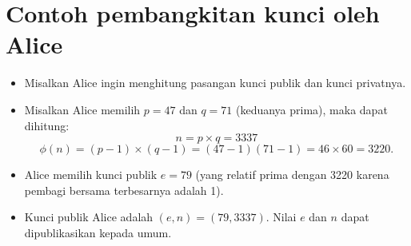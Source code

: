 \documentclass{article}
\begin{document}

\section*{Contoh pembangkitan kunci oleh Alice}

\begin{itemize}
    \item Misalkan Alice ingin menghitung pasangan kunci publik dan kunci privatnya.
    \item Misalkan Alice memilih $p = 47$ dan $q = 71$ (keduanya prima), maka dapat dihitung:
    \[ n = p \times q = 3337 \]
    \[ \phi(n) = (p - 1) \times (q - 1) = (47 - 1)(71 - 1) = 46 \times 60 = 3220. \]
    \item Alice memilih kunci publik $e = 79$ (yang relatif prima dengan 3220 karena pembagi bersama terbesarnya adalah 1).
    \item Kunci publik Alice adalah $(e, n) = (79, 3337)$. Nilai $e$ dan $n$ dapat dipublikasikan kepada umum.
\end{itemize}
\end{document}
